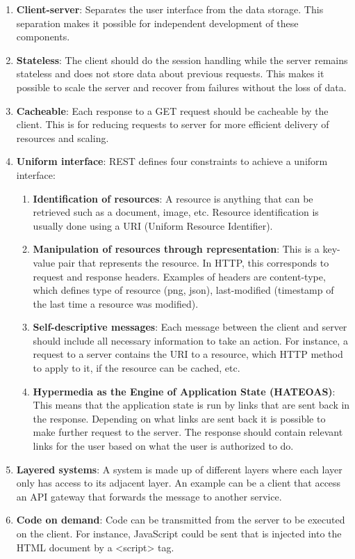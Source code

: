 \documentclass[a4paper,12pt]{article}
\begin{document}
\begin{enumerate}
\item \textbf{Client-server}: Separates the user interface from the data storage. This separation makes it possible for independent development of these components. 
\item \textbf{Stateless}: The client should do the session handling while the server remains stateless and does not store data about previous requests. This makes it possible to scale the server and recover from failures without the loss of data.
\item \textbf{Cacheable}: Each response to a GET request should be cacheable by the client. This is for reducing requests to server for more efficient delivery of resources and scaling. 
\item \textbf{Uniform interface}: REST defines four constraints to achieve a uniform interface: 
\begin{enumerate}
\item \textbf{Identification of resources}: A resource is anything that can be retrieved such as a document, image, etc. Resource identification is usually done using a URI (Uniform Resource Identifier).

\item \textbf{Manipulation of resources through representation}: This is a key-value pair that represents the resource. In HTTP, this corresponds to request and response headers. Examples of headers are content-type, which defines type of resource (png, json), last-modified (timestamp of the last time a resource was modified).

\item \textbf{Self-descriptive messages}: Each message between the client and server should include all necessary information to take an  action. For instance, a request to a server contains the URI to a resource, which HTTP method to apply to it, if the resource can be cached, etc.

\item \textbf{Hypermedia as the Engine of Application State (HATEOAS)}: This means that the application state is run by links that are sent back in the response. Depending on what links are sent back it is possible to make further request to the server. The response should contain relevant links for the user based on what the user is authorized to do. 
\end{enumerate}

\item \textbf{Layered systems}: A system is made up of different layers where each layer only has access to its adjacent layer. An example can be a client that access an API gateway that forwards the message to another service.

\item \textbf{Code on demand}: Code can be transmitted from the server to be executed on the client. For instance, JavaScript could be sent that is injected into the HTML document by a <script> tag.
\end{enumerate}
\end{document}
